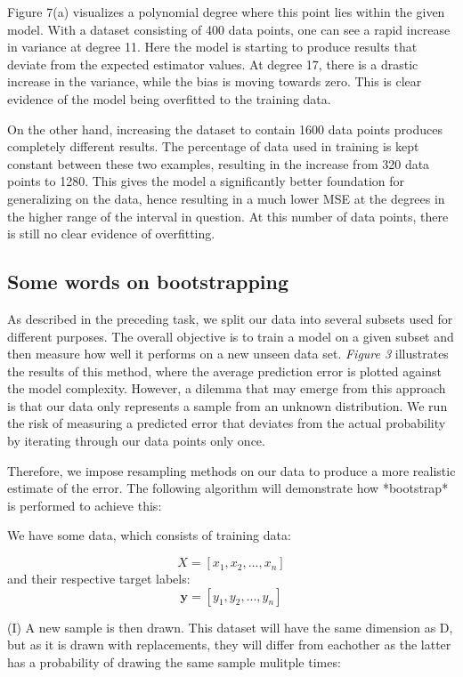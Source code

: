 \documentclass[11pt, a4paper]{article}
\begin{document}
Figure 7(a) visualizes a polynomial degree where this point lies within the given model.  With a dataset consisting of 400 data points, one can see a rapid increase in variance at degree 11. Here the model is starting to produce results that deviate from the expected estimator values. At degree 17, there is a drastic increase in the variance, while the bias is moving towards zero. This is clear evidence of the model being overfitted to the training data. 

On the other hand, increasing the dataset to contain 1600 data points produces completely different results. The percentage of data used in training is kept constant between these two examples, resulting in the increase from 320 data points to 1280. This gives the model a significantly better foundation for generalizing on the data, hence resulting in a much lower MSE at the degrees in the higher range of the interval in question. At this number of data points, there is still no clear evidence of overfitting.  

\subsection*{Some words on bootstrapping}
As described in the preceding task, we split our data into several subsets used for different purposes. The overall objective is to train a model on a given subset and then measure how well it performs on a new unseen data set. \emph{Figure 3}  illustrates the results of this method, where the average prediction error is plotted against the model complexity. However, a dilemma that may emerge from this approach is that our data only represents a sample from an unknown distribution. We run the risk of measuring a predicted error that deviates from the actual probability by iterating through our data points only once.

Therefore, we impose resampling methods on our data to produce a more realistic estimate of the error. The following algorithm will demonstrate how *bootstrap* is performed to achieve this\cite{ref_forelesning}:

We have some data, which consists of training data:

$$X = [x_1,x_2,...,x_n]$$
and their respective target labels:
$$\bm{y} = [y_1,y_2,...,y_n]$$


(I) A new sample is then drawn. This dataset will have the same dimension as D, but as it is drawn with replacements, they will differ from eachother as the latter has a probability of drawing the same sample mulitple times:
\end{document}
